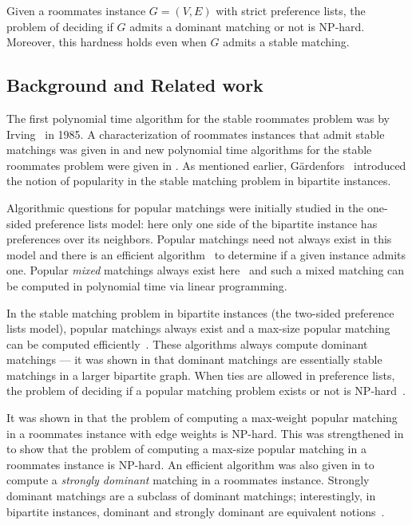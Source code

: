 \documentclass{llncs}
\begin{document}
\begin{theorem}
  \label{second-thm}
  Given a roommates instance $G = (V,E)$ with strict preference lists, the problem of deciding if $G$ admits a dominant matching or not
  is NP-hard. Moreover, this hardness holds even when $G$ admits a stable matching.
\end{theorem}  
  
\subsection{Background and Related work}
The first polynomial time algorithm for the stable roommates problem was by Irving~\cite{Irv85} in 1985. 
A characterization of roommates instances that admit stable matchings was given in \cite{Tan91} and 
new polynomial time algorithms for the stable roommates problem were given in \cite{Sub94,TS98}. As mentioned earlier,
G\"ardenfors~\cite{Gar75} introduced the notion of popularity in the stable matching problem in bipartite instances.

Algorithmic questions for popular matchings were initially studied in the one-sided preference lists model: here only one side of the bipartite instance
has preferences over its neighbors. Popular matchings need not always exist in this model and there is an efficient algorithm~\cite{AIKM07} to determine if
a given instance admits one. Popular {\em mixed} matchings always exist here~\cite{KMN09} and
such a mixed matching can be computed in polynomial time via linear programming.

In the stable matching problem in bipartite instances (the two-sided preference lists model), popular matchings always exist and 
a max-size popular matching can be computed efficiently~\cite{HK11,Kav12}. These algorithms always compute dominant matchings --- it was shown in \cite{CK16}
that dominant matchings are essentially stable matchings in a larger bipartite graph.
When ties are allowed in preference lists, 
the problem of deciding if a popular matching problem exists or not is NP-hard~\cite{BIM10,CHK15}.

It was shown in \cite{HK17} that the problem of computing a max-weight popular matching in a roommates instance with edge weights is NP-hard. This was
strengthened in \cite{Kav18} to show that  the problem of computing a max-size popular matching in a roommates instance is NP-hard. An efficient
algorithm was also given in \cite{Kav18} to compute a {\em strongly dominant} matching in a roommates instance. Strongly dominant matchings are a
subclass of dominant matchings; interestingly, in bipartite instances, dominant and strongly dominant are equivalent notions~\cite{Kav12}.
\end{document}
